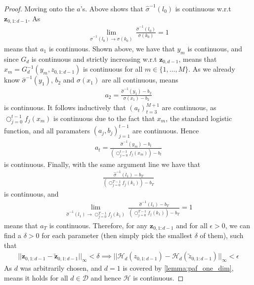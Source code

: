 \begin{proof}
    Moving onto the \(a\)'s. Above shows that \(\hat{\sigma}^{-1}(l_0)\) is continuous w.r.t \(\bm z_{0,1:d-1}\). As 
    \begin{align*}
        \lim\limits_{\hat{\sigma}^{-1}(l_0) \rightarrow \sigma(k_0)}\, \frac{\hat{\sigma}^{-1}(l_0)}{\sigma(k_0)} = 1
    \end{align*}
    means that \(a_1\) is continuous. Shown above, we have that \(y_m\) is continuous, and since \(G_d\) is continuous and strictly increasing w.r.t
    \(\bm z_{0,d-1}\), means that \(x_m = G_d^{-1}(y_m, z_{0,1:d-1})\) is continuous for all \(m \in \{1,\dots,M\}\). As we already know 
    \(\hat{\sigma}^{-1}(y_1)\), \(b_2\) and \(\sigma(x_1)\) are all continuous, means 
    \begin{align*}
        a_2 = \frac{\hat{\sigma}^{-1}(y_1) - b_2}{\sigma(x_1) - b_2}
    \end{align*}
    is continuous. It follows inductively that \((a_t)_{t=3}^{M+1}\) are continuous, as \(\bigcirc_{j=0}^{t-1} f_j(x_m)\) is continuous due to 
    the fact that \(x_m\), the standard logistic function, and all paramaters \((a_j,b_j)_{j=1}^{t-1}\) are continuous. Hence
    \begin{align*}
        a_t = \frac{\hat{\sigma}^{-1}(y_m) - b_t}{(\bigcirc_{j=0}^{t-1} f_j(x_m)) - b_t}
    \end{align*}
    is continuous. Finally, with the same argument line we have that 
    \begin{align*}
        \frac{\hat{\sigma}^{-1}(l_1) - b_T}{(\bigcirc_{j=0}^{T-1} f_j(k_1)) - b_T}
    \end{align*}
    is continuous, and 
    \begin{align*}
        \lim\limits_{\hat{\sigma}^{-1}(l_1) \to \bigcirc_{j=0}^{T-1} f_j(k_1)} \,
        \frac{\hat{\sigma}^{-1}(l_1) - b_T}{(\bigcirc_{j=0}^{T-1} f_j(k_1)) - b_T} = 1
    \end{align*}
    means that \(a_T\) is continuous. Therefore, for any \(\bm z_{0,1:d-1}\) and for all \(\epsilon > 0\), we can find a \(\delta > 0\) for each parameter (then simply pick the smallest
    \(\delta\) of them), such that 
    \begin{align*}
        \lvert\lvert \bm z_{0,1:d-1} - \tilde{\bm z}_{0,1:d-1}\rvert\rvert_{\infty} < \delta \implies \lvert\lvert \mathcal{H}_d(z_{0,1:d-1}) -
        \mathcal{H}_d(\tilde z_{0,1:d-1})\rvert\rvert_{\infty} < \epsilon
    \end{align*}
    As \(d\) was arbitrarily chosen, and \(d=1\) is covered by \cref{lemma:paf_one_dim}, means it holds for all \(d \in \mathcal{D}\) and hence \(\mathcal{H}\)
    is continuous.
 \end{proof}

